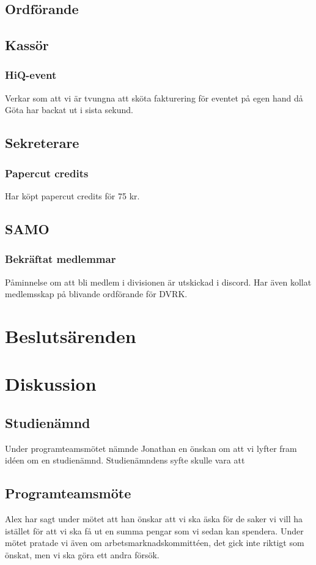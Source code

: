 \documentclass[protokoll]{dvd}
\begin{document}
\subsection{Ordförande}

\subsection{Kassör}
    \subsubsection{HiQ-event}
    Verkar som att vi är tvungna att sköta fakturering för eventet på egen hand då Göta har backat ut i sista sekund.

\subsection{Sekreterare}
    \subsubsection{Papercut credits}
    Har köpt papercut credits för 75 kr.

\subsection{SAMO}
    \subsubsection{Bekräftat medlemmar}
    Påminnelse om att bli medlem i divisionen är utskickad i discord. Har även kollat medlemsskap på blivande ordförande för DVRK.

\section{Beslutsärenden}

\section{Diskussion}
    \subsection{Studienämnd}
    Under programteamsmötet nämnde Jonathan en önskan om att vi lyfter fram idéen om en studienämnd. Studienämndens syfte skulle vara att

    \subsection{Programteamsmöte}
    Alex har sagt under mötet att han önskar att vi ska äska för de saker vi vill ha istället för att vi ska få ut en summa pengar som vi sedan kan spendera.
    Under mötet pratade vi även om arbetsmarknadskommittéen, det gick inte riktigt som önskat, men vi ska göra ett andra försök.
\end{document}

